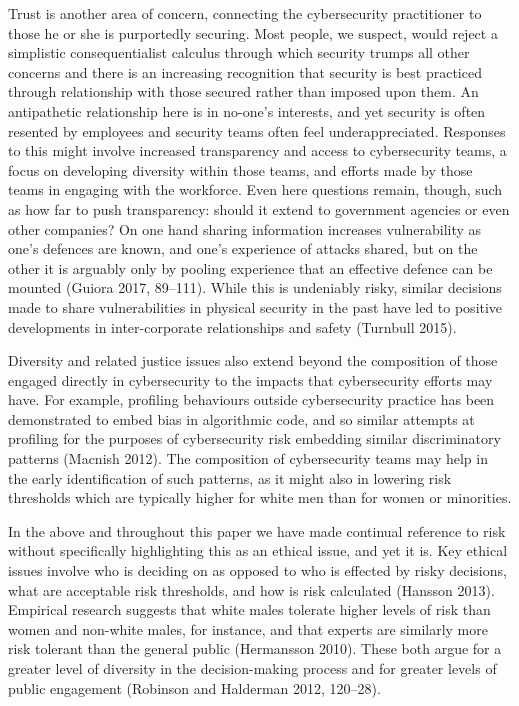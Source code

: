 \documentclass{svjour3}                     %
\begin{document}
Trust is another area of concern, connecting the cybersecurity practitioner to those he or she is purportedly securing. Most people, we suspect, would reject a simplistic consequentialist calculus through which security trumps all other concerns and there is an increasing recognition that security is best practiced through relationship with those secured rather than imposed upon them. An antipathetic relationship here is in no-one’s interests, and yet security is often resented by employees and security teams often feel underappreciated. Responses to this might involve increased transparency and access to cybersecurity teams, a focus on developing diversity within those teams, and efforts made by those teams in engaging with the workforce. Even here questions remain, though, such as how far to push transparency: should it extend to government agencies or even other companies? On one hand sharing information increases vulnerability as one’s defences are known, and one’s experience of attacks shared, but on the other it is arguably only by pooling experience that an effective defence can be mounted (Guiora 2017, 89–111). While this is undeniably risky, similar decisions made to share vulnerabilities in physical security in the past have led to positive developments in inter-corporate relationships and safety (Turnbull 2015).

Diversity and related justice issues also extend beyond the composition of those engaged directly in cybersecurity to the impacts that cybersecurity efforts may have. For example, profiling behaviours outside cybersecurity practice has been demonstrated to embed bias in algorithmic code, and so similar attempts at profiling for the purposes of cybersecurity risk embedding similar discriminatory patterns (Macnish 2012). The composition of cybersecurity teams may help in the early identification of such patterns, as it might also in lowering risk thresholds which are typically higher for white men than for women or minorities.

In the above and throughout this paper we have made continual reference to risk without specifically highlighting this as an ethical issue, and yet it is. Key ethical issues involve who is deciding on as opposed to who is effected by risky decisions, what are acceptable risk thresholds, and how is risk calculated (Hansson 2013). Empirical research suggests that white males tolerate higher levels of risk than women and non-white males, for instance, and that experts are similarly more risk tolerant than the general public (Hermansson 2010). These both argue for a greater level of diversity in the decision-making process and for greater levels of public engagement (Robinson and Halderman 2012, 120–28).
\end{document}
